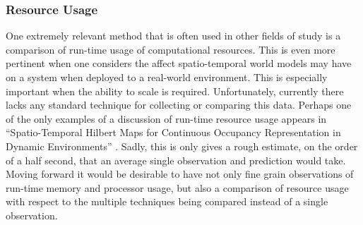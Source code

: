   \subsubsection { Resource Usage }

  One extremely relevant method that is often used in other fields of study
  is a comparison of run-time usage of computational resources. This is even
  more pertinent when one considers the affect spatio-temporal world models may
  have on a system when deployed to a real-world environment. This is especially
  important when the ability to scale is required. Unfortunately, currently
  there lacks any standard technique for collecting or comparing this data.
  Perhaps one of the only examples of a discussion of run-time resource usage
  appears in ``Spatio-Temporal Hilbert Maps for Continuous Occupancy Representation in Dynamic Environments'' \cite{Senanayake2016}.
  Sadly, this is only gives a rough estimate, on the order of a half second,
  that an average single observation and prediction would take. Moving forward
  it would be desirable to have not only fine grain observations of run-time
  memory and processor usage, but also a comparison of resource usage with
  respect to the multiple techniques being compared instead of a single observation.



